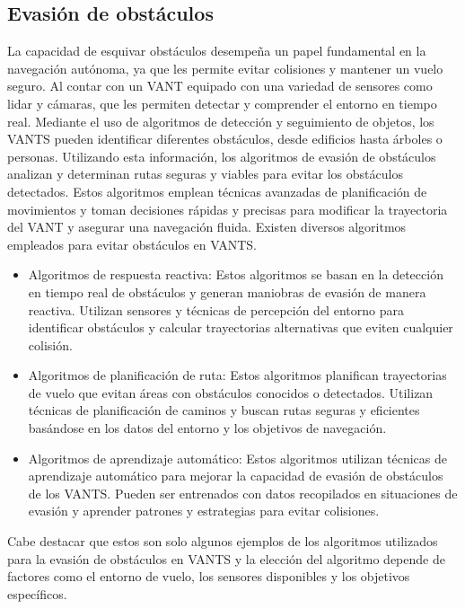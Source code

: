 \documentclass[sigconf]{acmart}
\begin{document}
\subsection*{Evasión de obstáculos}

La capacidad de esquivar obstáculos desempeña un papel fundamental en la navegación autónoma, ya que les permite evitar colisiones y mantener un vuelo seguro. Al contar con un VANT equipado con una variedad de sensores como lidar y cámaras, que les permiten detectar y comprender el entorno en tiempo real. Mediante el uso de algoritmos de detección y seguimiento de objetos, los VANTS pueden identificar diferentes obstáculos, desde edificios hasta árboles o personas. Utilizando esta información, los algoritmos de evasión de obstáculos analizan y determinan rutas seguras y viables para evitar los obstáculos detectados. Estos algoritmos emplean técnicas avanzadas de planificación de movimientos y toman decisiones rápidas y precisas para modificar la trayectoria del VANT y asegurar una navegación fluida. Existen diversos algoritmos empleados para evitar obstáculos en VANTS.

\begin{itemize}
\item Algoritmos de respuesta reactiva: Estos algoritmos se basan en la detección en tiempo real de obstáculos y generan maniobras de evasión de manera reactiva. Utilizan sensores y técnicas de percepción del entorno para identificar obstáculos y calcular trayectorias alternativas que eviten cualquier colisión.
\item Algoritmos de planificación de ruta: Estos algoritmos planifican trayectorias de vuelo que evitan áreas con obstáculos conocidos o detectados. Utilizan técnicas de planificación de caminos y buscan rutas seguras y eficientes basándose en los datos del entorno y los objetivos de navegación.
\item Algoritmos de aprendizaje automático: Estos algoritmos utilizan técnicas de aprendizaje automático para mejorar la capacidad de evasión de obstáculos de los VANTS. Pueden ser entrenados con datos recopilados en situaciones de evasión y aprender patrones y estrategias para evitar colisiones.
\end{itemize}
  
Cabe destacar que estos son solo algunos ejemplos de los algoritmos utilizados para la evasión de obstáculos en VANTS y la elección del algoritmo depende de factores como el entorno de vuelo, los sensores disponibles y los objetivos específicos.
\end{document}
